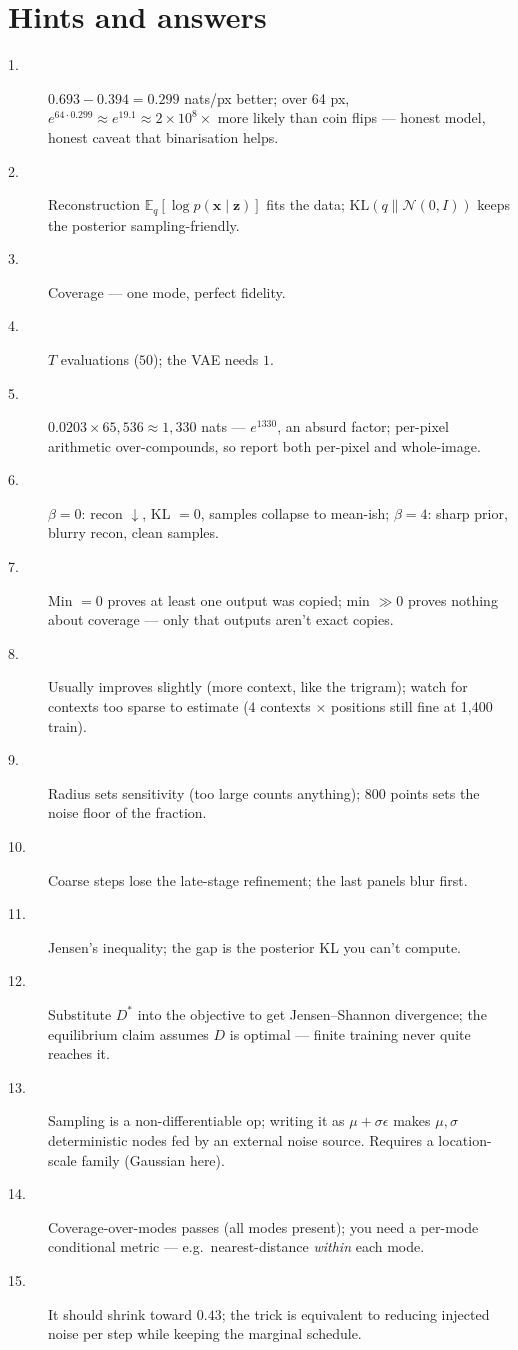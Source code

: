 \section*{Hints and answers}
\begin{description}
\item[1.] $0.693 - 0.394 = 0.299$ nats/px better; over 64 px,
$e^{64\cdot0.299} \approx e^{19.1} \approx 2\times10^{8}\times$ more
likely than coin flips --- honest model, honest caveat that
binarisation helps.
\item[2.] Reconstruction $\mathbb E_q[\log p(\mathbf x\mid\mathbf z)]$
fits the data; $\mathrm{KL}(q\|\mathcal N(0,I))$ keeps the posterior
sampling-friendly.
\item[3.] Coverage --- one mode, perfect fidelity.
\item[4.] $T$ evaluations ($50$); the VAE needs $1$.
\item[5.] $0.0203 \times 65{,}536 \approx 1{,}330$ nats ---
$e^{1330}$, an absurd factor; per-pixel arithmetic over-compounds, so
report both per-pixel and whole-image.
\item[6.] $\beta{=}0$: recon $\downarrow$, KL $=0$, samples collapse
to mean-ish; $\beta{=}4$: sharp prior, blurry recon, clean samples.
\item[7.] Min $=0$ proves at least one output was copied; min $\gg0$
proves nothing about coverage --- only that outputs aren't exact
copies.
\item[8.] Usually improves slightly (more context, like the trigram);
watch for contexts too sparse to estimate ($4$ contexts $\times$
positions still fine at 1{,}400 train).
\item[9.] Radius sets sensitivity (too large counts anything); 800
points sets the noise floor of the fraction.
\item[10.] Coarse steps lose the late-stage refinement; the last
panels blur first.
\item[11.] Jensen's inequality; the gap is the posterior KL you
can't compute.
\item[12.] Substitute $D^*$ into the objective to get Jensen--Shannon
divergence; the equilibrium claim assumes $D$ is optimal --- finite
training never quite reaches it.
\item[13.] Sampling is a non-differentiable op; writing it as
$\mu+\sigma\epsilon$ makes $\mu,\sigma$ deterministic nodes fed by an
external noise source. Requires a location-scale family (Gaussian
here).
\item[14.] Coverage-over-modes passes (all modes present); you need a
per-mode conditional metric --- e.g.\ nearest-distance \emph{within}
each mode.
\item[15.] It should shrink toward $0.43$; the trick is equivalent to
reducing injected noise per step while keeping the marginal
schedule.
\end{description}
